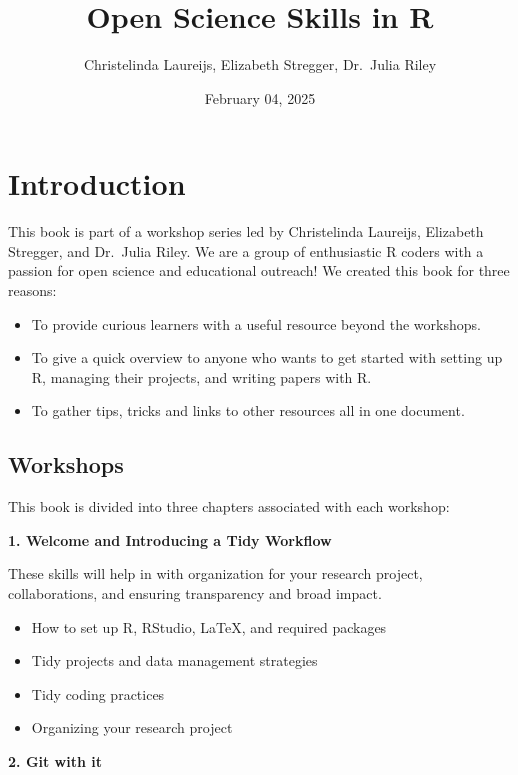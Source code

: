 \documentclass[
]{book}
\title{Open Science Skills in R}
\author{Christelinda Laureijs, Elizabeth Stregger, Dr.~Julia Riley}
\date{February 04, 2025}
\providecommand{\tightlist}{%
  \setlength{\itemsep}{0pt}\setlength{\parskip}{0pt}}
\begin{document}
\maketitle

{
\setcounter{tocdepth}{1}
\tableofcontents
}
\chapter*{Introduction}\label{introduction}

This book is part of a workshop series led by Christelinda Laureijs, Elizabeth Stregger, and Dr.~Julia Riley. We are a group of enthusiastic R coders with a passion for open science and educational outreach! We created this book for three reasons:

\begin{itemize}
\tightlist
\item
  To provide curious learners with a useful resource beyond the workshops.
\item
  To give a quick overview to anyone who wants to get started with setting up R, managing their projects, and writing papers with R.
\item
  To gather tips, tricks and links to other resources all in one document.
\end{itemize}

\section{Workshops}\label{workshops}

This book is divided into three chapters associated with each workshop:

\textbf{1. Welcome and Introducing a Tidy Workflow}

These skills will help in with organization for your research project,
collaborations, and ensuring transparency and broad impact.

\begin{itemize}
\tightlist
\item
  How to set up R, RStudio, LaTeX, and required packages
\item
  Tidy projects and data management strategies
\item
  Tidy coding practices
\item
  Organizing your research project
\end{itemize}

\textbf{2. Git with it}
\end{document}
